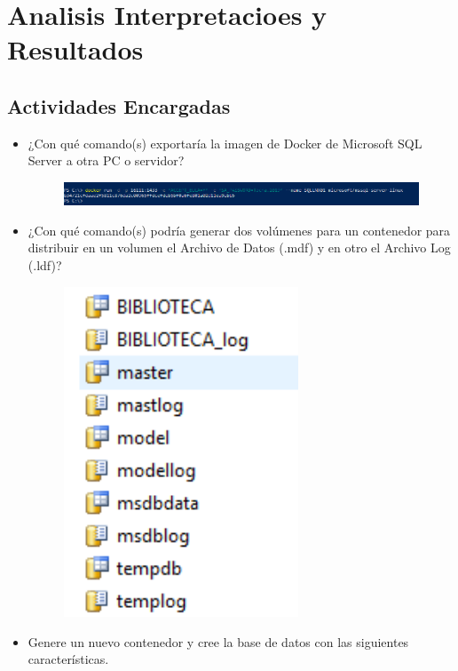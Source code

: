 \section{Analisis Interpretacioes y Resultados} 


\subsection{ Actividades Encargadas}
	\begin{itemize}
		\item ¿Con qué comando(s) exportaría la imagen de Docker de Microsoft SQL Server a otra PC o servidor?
                      \begin{figure}[H]
		\begin{center}
		\includegraphics[width=15cm]{./Imagenes/6}
		\end{center}
		\end{figure} 
		\item ¿Con qué comando(s) podría generar dos volúmenes para un contenedor para distribuir en un volumen el Archivo de Datos (.mdf) y en otro el Archivo Log (.ldf)? 
                     \begin{figure}[H]
		\begin{center}
		\includegraphics[width=7cm]{./Imagenes/18}
		\end{center}
		\end{figure} 
		\item Genere un nuevo contenedor y cree la base de datos con las siguientes características.

\end{itemize}
